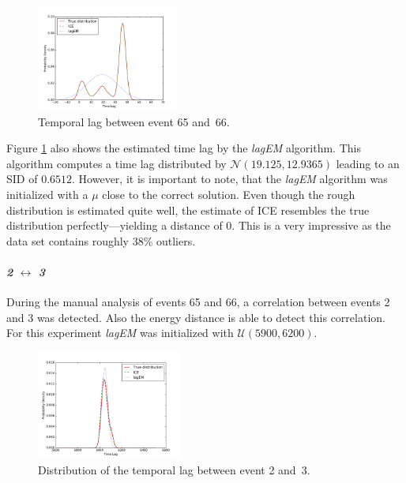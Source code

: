\documentclass[conference]{IEEEtran}
\theoremstyle{examplestyle}
\newcommand\imgsize{0.415}
\begin{document}
\begin{figure}[!tb]
	\centering
	\includegraphics[width=\imgsize\textwidth]{images/symantec/66-65.pdf}
	\caption{Temporal lag between event 65 and~66.}
	\label{fig:66-65}
\end{figure}

Figure \ref{fig:66-65} also shows the estimated time lag by the \textit{lagEM} algorithm. This algorithm computes a time lag distributed by \(\mathcal{N}(19.125, 12.9365)\) leading to an \ac{SID} of $0.6512$. However, it is important to note, that the \textit{lagEM} algorithm was initialized with a \(\mu\) close to the correct solution. Even though the rough distribution is estimated quite well, the estimate of \ac{ICE} resembles the true distribution perfectly---yielding a distance of $0$. This is a very impressive as the data set contains roughly 38\% outliers.



\paragraph{\textit{2} \(\leftrightarrow\) \textit{3}} During the manual analysis of events 65 and 66, a correlation between events 2 and 3 was detected. Also the energy distance is able to detect this correlation. For this experiment \textit{lagEM} was initialized with \(\mathcal{U}(5900, 6200)\).

\begin{figure}[!tb]
	\centering
	\includegraphics[width=0.425\textwidth]{images/symantec/2-3.pdf}
	\caption{Distribution of the temporal lag between event 2 and~3.}
	\label{fig:2-3}
\end{figure}
\end{document}
